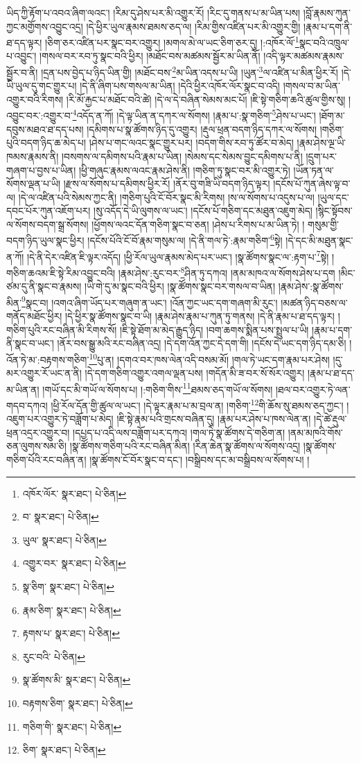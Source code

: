 ཡིད་ཀྱི་རྟོག་པ་འབའ་ཞིག་ལའང་། །རིམ་དུ་ཤེས་པར་མི་འགྱུར་རོ། །རིང་དུ་གནས་པ་མ་ཡིན་པས། །བློ་རྣམས་ཀུན་ཀྱང་མགྱོགས་འབྱུང་འདྲ། །དེ་ཕྱིར་ཡུལ་རྣམས་ཐམས་ཅད་ལ། །རིམ་གྱིས་འཛིན་པར་མི་འགྱུར་གྱི། །རྣམ་པ་དག་ནི་ཐ་དད་ལྟར། །ཅིག་ཅར་འཛིན་པར་སྣང་བར་འགྱུར། །མགལ་མེ་ལ་ཡང་ཅིག་ཅར་དུ། །:འཁོར་ལོ་\footnote{འཁོར་ལོར་  སྣར་ཐང་།  པེ་ཅིན། }སྣང་བའི་འཁྲུལ་པ་འབྱུང་། །གསལ་བར་རབ་ཏུ་སྣང་བའི་ཕྱིར། །མཐོང་བས་མཚམས་སྦྱོར་མ་ཡིན་ནོ། །འདི་ལྟར་མཚམས་རྣམས་སྦྱོར་བ་ནི། །དྲན་པས་བྱེད་པ་ཉིད་ཡིན་གྱི། །མཐོང་བས་\footnote{བ་  སྣར་ཐང་།  པེ་ཅིན། }མ་ཡིན་འདས་པ་ཡི། །ཡུན་\footnote{ཡུལ་  སྣར་ཐང་།  པེ་ཅིན། }ལ་འཛིན་པ་མིན་ཕྱིར་རོ། །དེ་ཡི་ཡུལ་དུ་གང་གྱུར་པ། །དེ་ནི་ཞིག་པས་གསལ་མ་ཡིན། །དེའི་ཕྱིར་འཁོར་ལོར་སྣང་བ་འདི། །གསལ་བ་མ་ཡིན་འགྱུར་བའི་རིགས། །རི་མོ་རྐྱང་པ་མཐོང་བའི་ཚེ། །དེ་ལ་དེ་བཞིན་སེམས་མང་པོ། །ཇི་སྟེ་གཅིག་ཆའི་ཚུལ་གྱིས་སུ། །འབྱུང་བར་:འགྱུར་བ་\footnote{འགྱུར་བར་  སྣར་ཐང་།  པེ་ཅིན། }འདོད་ན་ཀོ། །དེ་ལྟ་ཡིན་ན་དཀར་ལ་སོགས། །རྣམ་པ་:སྣ་གཅིག་\footnote{སྣ་ཅིག་  སྣར་ཐང་།  པེ་ཅིན། }ཤེས་པ་ཡང་། །ཐོག་མ་དབུས་མཐའ་ཐ་དད་པས། །དམིགས་པ་སྣ་ཚོགས་ཉིད་དུ་འགྱུར། །རྡུལ་ཕྲན་བདག་ཉིད་དཀར་ལ་སོགས། །གཅིག་པུའི་བདག་ཉིད་ཆ་མེད་པ། །ཤེས་པ་གང་ལའང་སྣང་གྱུར་པར། །བདག་གིས་རབ་ཏུ་ཚོར་བ་མེད། །རྣམ་ཤེས་ལྔ་ཡི་ཁམས་རྣམས་ནི། །བསགས་ལ་དམིགས་པའི་རྣམ་པ་ཡིན། །སེམས་དང་སེམས་བྱུང་དམིགས་པ་ནི། །དྲུག་པར་གཞག་པ་བྱས་པ་ཡིན། །ཕྱི་གཞུང་རྣམས་ལའང་རྣམ་ཤེས་ནི། །གཅིག་ཏུ་སྣང་བར་མི་འགྱུར་ཏེ། །ཡོན་ཏན་ལ་སོགས་ལྡན་པ་ཡི། །རྫས་ལ་སོགས་པ་དམིགས་ཕྱིར་རོ། །ནོར་བུ་གཟི་ཡི་བདག་ཉིད་ལྟར། །དངོས་པོ་ཀུན་ཞེས་ལྟ་བ་ལ། །དེ་ལ་འཛིན་པའི་སེམས་ཀྱང་ནི། །གཅིག་པུའི་ངོ་བོར་སྣང་མི་རིགས། །ས་ལ་སོགས་པ་འདུས་པ་ལ། །ཡུལ་དང་དབང་པོར་ཀུན་འཇོག་པར། །སུ་འདོད་དེ་ཡི་ལུགས་ལ་ཡང་། །དངོས་པོ་གཅིག་དང་མཐུན་འཇུག་མེད། །སྙིང་སྟོབས་ལ་སོགས་བདག་སྒྲ་སོགས། །ཕྱོགས་ལའང་དོན་གཅིག་སྣང་བ་ཅན། །ཤེས་པ་རིགས་པ་མ་ཡིན་ཏེ། །
གསུམ་གྱི་བདག་ཉིད་ཡུལ་སྣང་ཕྱིར། །དངོས་པོའི་ངོ་བོ་རྣམ་གསུམ་ལ། །དེ་ནི་གལ་ཏེ་:རྣམ་གཅིག་\footnote{རྣམ་ཅིག་  སྣར་ཐང་།  པེ་ཅིན། }སྟེ། །དེ་དང་མི་མཐུན་སྣང་ན་ཀོ། །དེ་ནི་དེར་འཛིན་ཇི་ལྟར་འདོད། །ཕྱི་རོལ་ཡུལ་རྣམས་མེད་པར་ཡང་། །སྣ་ཚོགས་སྣང་ལ་:རྟག་པ་\footnote{རྟགས་པ་  སྣར་ཐང་།  པེ་ཅིན། }སྟེ། །གཅིག་ཆའམ་ཇི་སྟེ་རིམ་འབྱུང་བའི། །རྣམ་ཤེས་:རུང་བར་\footnote{རུང་བའི་  པེ་ཅིན། }ཤིན་ཏུ་དཀའ། །ནམ་མཁའ་ལ་སོགས་ཤེས་པ་དག །མིང་ཙམ་དུ་ནི་སྣང་བ་རྣམས། །ཡི་གེ་དུ་མ་སྣང་བའི་ཕྱིར། །སྣ་ཚོགས་སྣང་བར་གསལ་བ་ཡིན། །རྣམ་ཤེས་:སྣ་ཚོགས་མིན་\footnote{སྣ་ཚོགས་མི་  སྣར་ཐང་།  པེ་ཅིན། }སྣང་བ། །འགའ་ཞིག་ཡོད་པར་གཞུག་ན་ཡང་། །འོན་ཀྱང་ཡང་དག་གཞག་མི་རུང་། །མཚན་ཉིད་བཅས་ལ་གནོད་མཐོང་ཕྱིར། །དེ་ཕྱིར་སྣ་ཚོགས་སྣང་བ་ཡི། །རྣམ་ཤེས་རྣམ་པ་ཀུན་ཏུ་གནས། །དེ་ནི་རྣམ་པ་ཐ་དད་ལྟར། །གཅིག་པུའི་རང་བཞིན་མི་རིགས་སོ། །ཇི་སྟེ་ཐོག་མ་མེད་རྒྱུད་ཉིད། །བག་ཆགས་སྨིན་པས་སྤྲུལ་པ་ཡི། །རྣམ་པ་དག་ནི་སྣང་བ་ཡང་། །ནོར་བས་སྒྱུ་མའི་རང་བཞིན་འདྲ། །དེ་དག་འོན་ཀྱང་དེ་དག་གི། །དངོས་དེ་ཡང་དག་ཉིད་དམ་ཅི། །འོན་ཏེ་མ་:བརྟགས་གཅིག་\footnote{བརྟགས་ཅིག་  སྣར་ཐང་།  པེ་ཅིན། }པུ་ན། །དགའ་བར་ཁས་ལེན་འདི་བསམ་མོ། །གལ་ཏེ་ཡང་དག་རྣམ་པར་ཤེས། །དུ་མར་འགྱུར་རོ་ཡང་ན་ནི། །དེ་དག་གཅིག་འགྱུར་འགལ་ལྡན་པས། །གདོན་མི་ཟ་བར་སོ་སོར་འགྱུར། །རྣམ་པ་ཐ་དད་མ་ཡིན་ན། །གཡོ་དང་མི་གཡོ་ལ་སོགས་པ། །:གཅིག་གིས་\footnote{གཅིག་གི་  སྣར་ཐང་།  པེ་ཅིན། }ཐམས་ཅད་གཡོ་ལ་སོགས། །ཐལ་བར་འགྱུར་ཏེ་ལན་གདབ་དཀའ། །ཕྱི་རོལ་དོན་གྱི་ཚུལ་ལ་ཡང་། །དེ་ལྟར་རྣམ་པ་མ་བྲལ་ན། །གཅིག་\footnote{ཅིག་  སྣར་ཐང་།  པེ་ཅིན། }གི་ཆོས་སུ་ཐམས་ཅད་ཀྱང་། །འཇུག་པར་འགྱུར་ཏེ་བཟློག་པ་མེད། །ཇི་སྟེ་རྣམ་པའི་གྲངས་བཞིན་དུ། །རྣམ་པར་ཤེས་པ་ཁས་ལེན་ན། །དེ་ཚེ་རྡུལ་ཕྲན་འདྲར་འགྱུར་བ། །དཔྱད་པ་འདི་ལས་བཟློག་པར་དཀའ། །གལ་ཏེ་སྣ་ཚོགས་དེ་གཅིག་ན། །ནམ་མཁའི་གོས་ཅན་ལུགས་སམ་ཅི། །སྣ་ཚོགས་གཅིག་པའི་རང་བཞིན་མིན། །རིན་ཆེན་སྣ་ཚོགས་ལ་སོགས་འདྲ། །སྣ་ཚོགས་གཅིག་པོའི་རང་བཞིན་ན། །སྣ་ཚོགས་ངོ་བོར་སྣང་བ་དང་། །བསྒྲིབས་དང་མ་བསྒྲིབས་ལ་སོགས་པ། །
